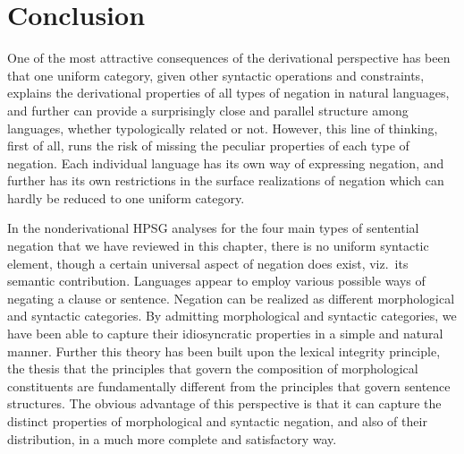 \documentclass[output=paper
                ,modfonts
                		,nonflat
	        ,collection
	        ,collectionchapter
	        ,collectiontoclongg
 	        ,biblatex
                ,babelshorthands
                ,newtxmath
                ,draftmode
                ,colorlinks, citecolor=brown
]{./langsci/langscibook}
\begin{document}
{\section{Conclusion}




One of the most attractive consequences of the
derivational perspective has been that one uniform category,
given other syntactic operations and constraints,
explains the derivational properties of all types of negation
in natural languages, and further can provide a surprisingly
close and parallel structure among languages, whether typologically
related or not. However, this line of thinking, first of all, runs the risk of
missing the peculiar properties of each type of
negation. Each individual language has its own
way of expressing negation, and further has
its own restrictions in the surface realizations of negation which
can hardly be reduced to one uniform category.


In the nonderivational HPSG analyses for the four main
types of sentential negation that we have reviewed
in this chapter,  there is no uniform
syntactic element, though a certain universal aspect of
negation does exist, viz.\ its semantic contribution.
Languages appear to employ various possible
ways of negating a clause or sentence. Negation can
be realized as different morphological and syntactic categories.
By admitting morphological and syntactic categories,
we have been able to capture their idiosyncratic properties in a
simple and natural manner. Further this theory has been built upon
the lexical integrity principle, the thesis that the principles that govern the
composition
of morphological
constituents are fundamentally different from the principles that
govern sentence structures. The obvious advantage of
this perspective is that it can capture the distinct properties of
morphological and syntactic negation, and also of their distribution,
in a much more complete and satisfactory way.

}
\end{document}
